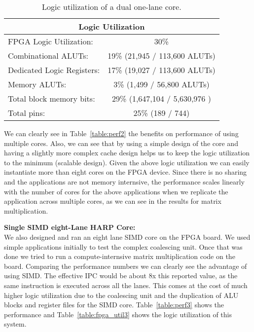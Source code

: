 \begin{table}[!htbp]
  \centering
  \caption{Logic utilization of a dual one-lane core.}
  \begin{tabular}{|l|c|}
    \hline
    \multicolumn{2}{|c|}{Logic Utilization} \\
    \hline
FPGA Logic Utilization:		& 30\% 	\\
   Combinational ALUTs:		& 19\% 	(21,945 / 113,600 ALUTs)\\
   Dedicated Logic Registers:	& 17\% 	(19,027 / 113,600 ALUTs)\\
   Memory ALUTs:		& 3\% 	(1,499 / 56,800 ALUTs)\\
Total block memory bits:	& 29\%  (1,647,104 / 5,630,976 )\\
Total pins:			& 25\% 	(189 / 744)\\
    \hline
  \end{tabular}
  \label{table:fpga_util2}
\end{table}

We can clearly see in Table~\ref{table:perf2} the benefits on performance of using multiple cores. Also, we can see that by using a simple design of the core and having a slightly more complex cache design helps us to keep the logic utilization to the minimum (scalable design). Given the above logic utilization we can easily instantiate more than eight cores on the FPGA device.
Since there is no sharing and the applications are not memory internsive, the performance scales linearly with the number of cores for the above applications when we replicate the application across multiple cores, as we can see in the results for matrix multiplication.

\noindent\textbf{Single SIMD eight-Lane HARP Core:}\\
We also designed and ran an eight lane SIMD core on the FPGA board. We used simple applications initially to test the complex coalescing unit. Once that was done we tried to run a compute-internsive matrix multiplication code on the board. Comparing the performance numbers we can clearly see the advantage of using SIMD. The effective IPC would be about 8x this reported value, as the same instruction is executed across all the lanes. This comes at the cost of much higher logic utilization due to the coalescing unit and the duplication of ALU blocks and register files for the SIMD core. Table~\ref{table:perf3} shows the performance and Table~\ref{table:fpga_util3} shows the logic utilization of this system.

